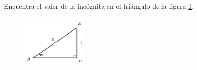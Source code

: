 Encuentra el valor de la incógnita en el triángulo de la figura \ref{fig:lados_functrig_03}.
\begin{figure}[H]
    \begin{center}
        \includegraphics[width=0.3\textwidth]{../images/lados_functrig_03.png}
    \end{center}
    \caption{}
    \label{fig:lados_functrig_03}
\end{figure}